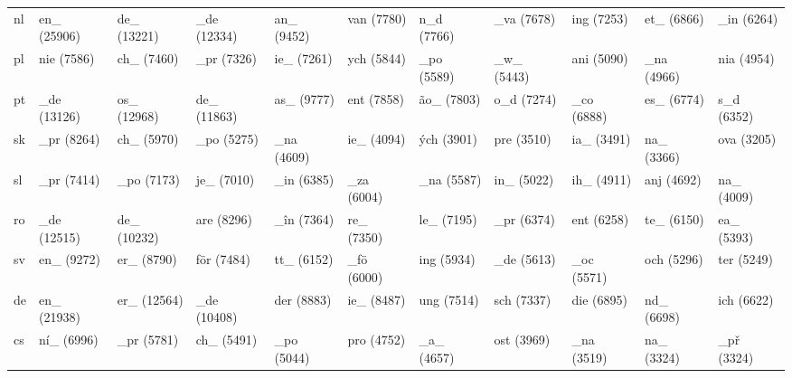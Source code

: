 \begin{tabular}{l|llllllllll}
nl	&en\_ (25906)	&de\_ (13221)	&\_de (12334)	&an\_ (9452)	&van (7780)	&n\_d (7766)	&\_va (7678)	&ing (7253)	&et\_ (6866)	&\_in (6264)\\
pl	&nie (7586)	&ch\_ (7460)	&\_pr (7326)	&ie\_ (7261)	&ych (5844)	&\_po (5589)	&\_w\_ (5443)	&ani (5090)	&\_na (4966)	&nia (4954)\\
pt	&\_de (13126)	&os\_ (12968)	&de\_ (11863)	&as\_ (9777)	&ent (7858)	&ão\_ (7803)	&o\_d (7274)	&\_co (6888)	&es\_ (6774)	&s\_d (6352)\\
sk	&\_pr (8264)	&ch\_ (5970)	&\_po (5275)	&\_na (4609)	&ie\_ (4094)	&ých (3901)	&pre (3510)	&ia\_ (3491)	&na\_ (3366)	&ova (3205)\\
sl	&\_pr (7414)	&\_po (7173)	&je\_ (7010)	&\_in (6385)	&\_za (6004)	&\_na (5587)	&in\_ (5022)	&ih\_ (4911)	&anj (4692)	&na\_ (4009)\\
ro	&\_de (12515)	&de\_ (10232)	&are (8296)	&\_în (7364)	&re\_ (7350)	&le\_ (7195)	&\_pr (6374)	&ent (6258)	&te\_ (6150)	&ea\_ (5393)\\
sv	&en\_ (9272)	&er\_ (8790)	&för (7484)	&tt\_ (6152)	&\_fö (6000)	&ing (5934)	&\_de (5613)	&\_oc (5571)	&och (5296)	&ter (5249)\\
de	&en\_ (21938)	&er\_ (12564)	&\_de (10408)	&der (8883)	&ie\_ (8487)	&ung (7514)	&sch (7337)	&die (6895)	&nd\_ (6698)	&ich (6622)\\
cs	&ní\_ (6996)	&\_pr (5781)	&ch\_ (5491)	&\_po (5044)	&pro (4752)	&\_a\_ (4657)	&ost (3969)	&\_na (3519)	&na\_ (3324)	&\_př (3324)\\
\end{tabular}
